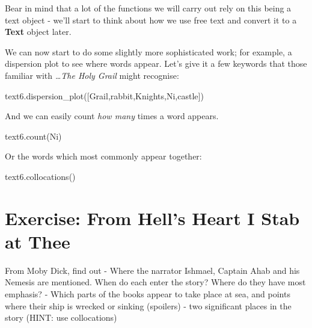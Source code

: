 \documentclass[
  letterpaper,
  DIV=11,
  numbers=noendperiod]{scrreprt}
\newenvironment{Shaded}{\begin{snugshade}}{\end{snugshade}}
\newcommand{\NormalTok}[1]{\textcolor[rgb]{0.00,0.23,0.31}{#1}}
\newcommand{\StringTok}[1]{\textcolor[rgb]{0.13,0.47,0.30}{#1}}
\begin{document}
Bear in mind that a lot of the functions we will carry out rely on this
being a text object - we'll start to think about how we use free text
and convert it to a \textbf{Text} object later.

We can now start to do some slightly more sophisticated work; for
example, a dispersion plot to see where words appear. Let's give it a
few keywords that those familiar with \emph{\ldots The Holy Grail} might
recognise:

\begin{Shaded}
\begin{Highlighting}[]
\NormalTok{text6.dispersion\_plot([}\StringTok{\textquotesingle{}Grail\textquotesingle{}}\NormalTok{,}\StringTok{\textquotesingle{}rabbit\textquotesingle{}}\NormalTok{,}\StringTok{\textquotesingle{}Knights\textquotesingle{}}\NormalTok{,}\StringTok{\textquotesingle{}Ni\textquotesingle{}}\NormalTok{,}\StringTok{\textquotesingle{}castle\textquotesingle{}}\NormalTok{])}
\end{Highlighting}
\end{Shaded}

And we can easily count \emph{how many} times a word appears.

\begin{Shaded}
\begin{Highlighting}[]
\NormalTok{text6.count(}\StringTok{\textquotesingle{}Ni\textquotesingle{}}\NormalTok{)}
\end{Highlighting}
\end{Shaded}

Or the words which most commonly appear together:

\begin{Shaded}
\begin{Highlighting}[]
\NormalTok{text6.collocations()}
\end{Highlighting}
\end{Shaded}

\hypertarget{exercise-from-hells-heart-i-stab-at-thee}{%
\section{Exercise: From Hell's Heart I Stab at
Thee}\label{exercise-from-hells-heart-i-stab-at-thee}}

From Moby Dick, find out - Where the narrator Ishmael, Captain Ahab and
his Nemesis are mentioned. When do each enter the story? Where do they
have most emphasis? - Which parts of the books appear to take place at
sea, and points where their ship is wrecked or sinking (spoilers) - two
significant places in the story (HINT: use collocations)
\end{document}
